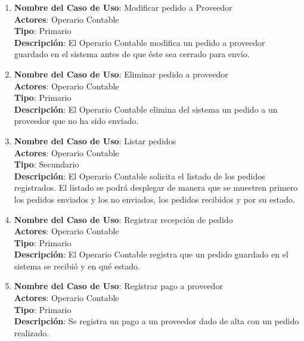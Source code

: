 \documentclass[12pt]{extarticle}
\begin{document}
\begin{spacing}{1.2}
\begin{enumerate}
        \item 	\textbf{Nombre del Caso de Uso}: Modificar pedido a Proveedor\\
                \textbf{Actores}: Operario Contable\\
                \textbf{Tipo}: Primario\\
                \textbf{Descripción}: El Operario Contable modifica un pedido a proveedor guardado en el sistema antes de que éste sea cerrado para envío.

        \item 	\textbf{Nombre del Caso de Uso}: Eliminar pedido a proveedor\\
                \textbf{Actores}: Operario Contable\\
                \textbf{Tipo}: Primario\\
                \textbf{Descripción}: El Operario Contable elimina del sistema un pedido a un proveedor que no ha sido enviado.


        \item 	\textbf{Nombre del Caso de Uso}: Listar pedidos \\
                \textbf{Actores}: Operario Contable\\
                \textbf{Tipo}: Secundario\\
                \textbf{Descripción}: El Operario Contable solicita el listado de los pedidos registrados. El listado se podrá desplegar de manera que se muestren primero los pedidos enviados y los no enviados, los pedidos recibidos y por su estado.

        \item 	\textbf{Nombre del Caso de Uso}: Registrar recepción de pedido\\
                \textbf{Actores}: Operario Contable\\
                \textbf{Tipo}: Primario\\
                \textbf{Descripción}: El Operario Contable registra que un pedido guardado en el sistema se recibió y en qué estado. 

        \item 	\textbf{Nombre del Caso de Uso}: Registrar pago a proveedor\\
                \textbf{Actores}: Operario Contable\\
                \textbf{Tipo}: Primario\\
                \textbf{Descripción}: Se registra un pago a un proveedor dado de alta con un pedido realizado.
    \end{enumerate}
    \clearpage















\end{spacing}
\end{document}
